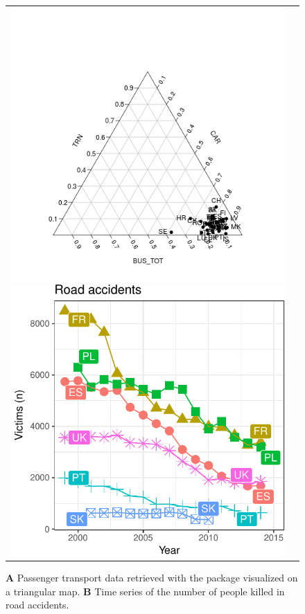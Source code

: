 \begin{figure}
\begin{center}
\begin{tabular}{cc}
\includegraphics{2015-manu-search2-1}
\includegraphics{2015-manu-roadacc-1}
\end{tabular}
\end{center}
\caption{{\bf A} Passenger transport data retrieved with the  package visualized on a triangular  map. {\bf B} Time series of the number of people killed in road accidents.}
\label{fig:transport}
\end{figure}



